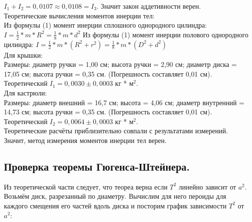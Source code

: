 \documentclass[a4paper]{article}
\begin{document}
    \item $I_1 + I_2 = 0,0107 \approx 0,0108 = I_3$. Значит закон аддетивности верен.\\

    Теоретические вычисления моментов инерции тел:\\

    Из формулы (1) момент инерции сплошного однородного цилиндра: $I = \frac{1}{2} * m * R^2 = \frac{1}{8} * m * d^2$
    Из формулы (1) момент инерции полового однородного цилиндра: $I = \frac{1}{2} * m * (R^2 + r^2) = \frac{1}{8} * m * (D^2 + d^2)$\\
    Для крышки:\\
    Размеры: диаметр ручки = 1,00 см; высота ручки = 2,90 см; диаметр диска = 17,05 см; высота ручки = 0,35 см. (Погрешность составляет 0,01 см).
    Теоретический $I_1 = 0,0030 \pm{0,0003}$ кг * м$^{2}$.\\

    Для кастрюли:\\
    Размеры: диаметр внешний = 16,7 см; высота = 4,06 см; диаметр внутренний = 14,73 см; высота ручки = 0,35 см. (Погрешность составляет 0,01 см).
    Теоретический $I_2 = 0,0064 \pm{0,0003}$ кг * м$^{2}$.\\

    Теоретические расчёты приблизительно совпали с результатами измерений. Значит, метод измерения моментов инерции тел верен.\\

\subsection {Проверка теоремы Гюгенса-Штейнера.}

Из теоретической части следует, что теореа верна если $T^2$ линейно зависит от $a^2$.\\

Возьмём диск, разрезанный по диаметру. Вычислим для него пероиды для каждого смещения его частей вдоль диска и посторим график зависимости $T^2$ от $a^2$:
\end{document}
